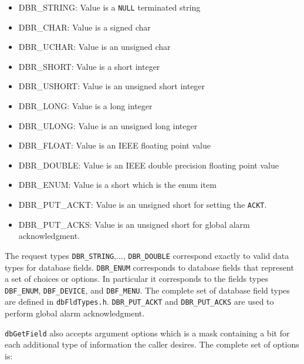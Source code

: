 \begin{itemize}
\item {}DBR\_STRING: Value is a \verb|NULL| terminated string

\item {}DBR\_CHAR: Value is a signed char

\item {}DBR\_UCHAR: Value is an unsigned char

\item {}DBR\_SHORT: Value is a short integer

\item {}DBR\_USHORT: Value is an unsigned short integer

\item {}DBR\_LONG: Value is a long integer

\item {}DBR\_ULONG: Value is an unsigned long integer

\item {}DBR\_FLOAT: Value is an IEEE floating point value

\item {}DBR\_DOUBLE: Value is an IEEE double precision floating point value

\item {}DBR\_ENUM: Value is a short which is the enum item

\item {}DBR\_PUT\_ACKT: Value is an unsigned short for setting the \verb|ACKT|.

\item {}DBR\_PUT\_ACKS: Value is an unsigned short for global alarm acknowledgment.

\end{itemize}

The request types \verb|DBR_STRING|,..., \verb|DBR_DOUBLE| correspond exactly to valid data types for database fields. \verb|DBR_ENUM| 
corresponds to database fields that represent a set of choices or options. In particular it corresponds to the fields types 
\verb|DBF_ENUM|, \verb|DBF_DEVICE|, and \verb|DBF_MENU|. The complete set of database field types are defined in \verb|dbFldTypes.h|. 
\verb|DBR_PUT_ACKT| and \verb|DBR_PUT_ACKS| are used to perform global alarm acknowledgment.

\verb|dbGetField| also accepts argument options which is a mask containing a bit for each additional type of information the 
caller desires. The complete set of options is:

